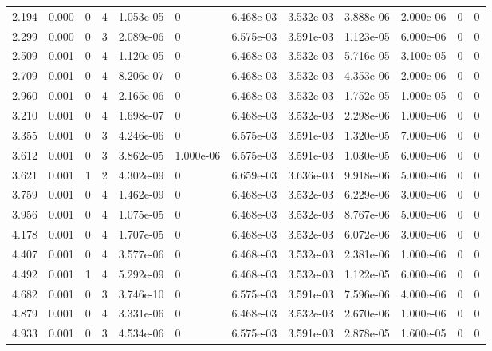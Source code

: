 \documentclass[preview]{standalone}
\begin{document}
{{\begin{tabular}{L{1.2cm}C{1.2cm} C{0.3cm}C{0.5cm} C{1.4cm}C{1.4cm} C{1.4cm}C{1.4cm} C{1.6cm}C{1.6cm} C{1.6cm}C{1.6cm}}
  2.194  &  0.000  & 0     &  4 &  1.053e-05  & 0  &  6.468e-03&   3.532e-03& 3.888e-06 & 2.000e-06   &  0 & 0  \\ 
  2.299  &  0.000  & 0     &  3 &  2.089e-06  & 0  &  6.575e-03&   3.591e-03& 1.123e-05 & 6.000e-06   &  0 & 0  \\ 
  2.509  &  0.001  & 0     &  4 &  1.120e-05  & 0  &  6.468e-03&   3.532e-03& 5.716e-05 & 3.100e-05   &  0 & 0  \\ 
  2.709  &  0.001  & 0     &  4 &  8.206e-07  & 0  &  6.468e-03&   3.532e-03& 4.353e-06 & 2.000e-06   &  0 & 0  \\ 
  2.960  &  0.001  & 0     &  4 &  2.165e-06  & 0  &  6.468e-03&   3.532e-03& 1.752e-05 & 1.000e-05   &  0 & 0  \\ 
  3.210  &  0.001  & 0     &  4 &  1.698e-07  & 0  &  6.468e-03&   3.532e-03& 2.298e-06 & 1.000e-06   &  0 & 0  \\ 
  3.355  &  0.001  & 0     &  3 &  4.246e-06  & 0  &  6.575e-03&   3.591e-03& 1.320e-05 & 7.000e-06   &  0 & 0  \\ 
  3.612  &  0.001  & 0     &  3 &  3.862e-05  & 1.000e-06  &  6.575e-03&   3.591e-03& 1.030e-05 & 6.000e-06   &  0 & 0  \\ 
  3.621  &  0.001  & 1     &  2 &  4.302e-09  & 0  &  6.659e-03&   3.636e-03& 9.918e-06 & 5.000e-06   &  0 & 0  \\ 
  3.759  &  0.001  & 0     &  4 &  1.462e-09  & 0  &  6.468e-03&   3.532e-03& 6.229e-06 & 3.000e-06   &  0 & 0  \\ 
  3.956  &  0.001  & 0     &  4 &  1.075e-05  & 0  &  6.468e-03&   3.532e-03& 8.767e-06 & 5.000e-06   &  0 & 0  \\ 
  4.178  &  0.001  & 0     &  4 &  1.707e-05  & 0  &  6.468e-03&   3.532e-03& 6.072e-06 & 3.000e-06   &  0 & 0  \\ 
  4.407  &  0.001  & 0     &  4 &  3.577e-06  & 0  &  6.468e-03&   3.532e-03& 2.381e-06 & 1.000e-06   &  0 & 0  \\ 
  4.492  &  0.001  & 1     &  4 &  5.292e-09  & 0  &  6.468e-03&   3.532e-03& 1.122e-05 & 6.000e-06   &  0 & 0  \\ 
  4.682  &  0.001  & 0     &  3 &  3.746e-10  & 0  &  6.575e-03&   3.591e-03& 7.596e-06 & 4.000e-06   &  0 & 0  \\ 
  4.879  &  0.001  & 0     &  4 &  3.331e-06  & 0  &  6.468e-03&   3.532e-03& 2.670e-06 & 1.000e-06   &  0 & 0  \\ 
  4.933  &  0.001  & 0     &  3 &  4.534e-06  & 0  &  6.575e-03&   3.591e-03& 2.878e-05 & 1.600e-05   &  0 & 0  \\ 

\end{tabular}}}
\end{document}
